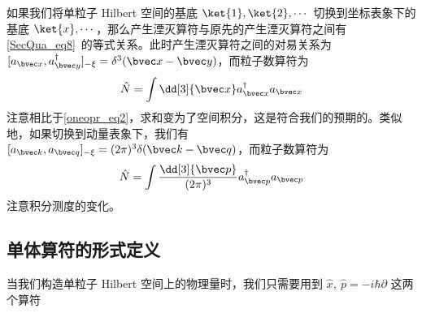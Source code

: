 如果我们将单粒子 Hilbert 空间的基底 $\ket{1},\ket{2},\cdots$ 切换到坐标表象下的基底 $\ket{x},\cdots$，那么产生湮灭算符与原先的产生湮灭算符之间有\autoref{SecQua_eq8}~的等式关系。此时产生湮灭算符之间的对易关系为 $[a_{\bvec x},a_{\bvec y}^\dagger]_{-\xi}=\delta^3(\bvec x-\bvec y)$，而粒子数算符为
\begin{equation}
\begin{aligned}
\hat N=\int \dd[3]{\bvec x} a^\dagger_{\bvec x} a_{\bvec x}
\end{aligned}
\end{equation}
注意相比于\autoref{oneopr_eq2}，求和变为了空间积分，这是符合我们的预期的。类似地，如果切换到动量表象下，我们有 $[a_{\bvec k},a_{\bvec q}]_{-\xi}= (2\pi)^3 \delta(\bvec k-\bvec q)$，而粒子数算符为
\begin{equation}
\begin{aligned}
\hat N=\int \frac{\dd[3]{\bvec p}}{(2\pi)^3} a^\dagger_{\bvec p} a_{\bvec p}
\end{aligned}
\end{equation}
注意积分测度的变化。
\subsection{单体算符的形式定义}
当我们构造单粒子 Hilbert 空间上的物理量时，我们只需要用到 $\hat x,\ \hat p=-i\hbar \partial$ 这两个算符